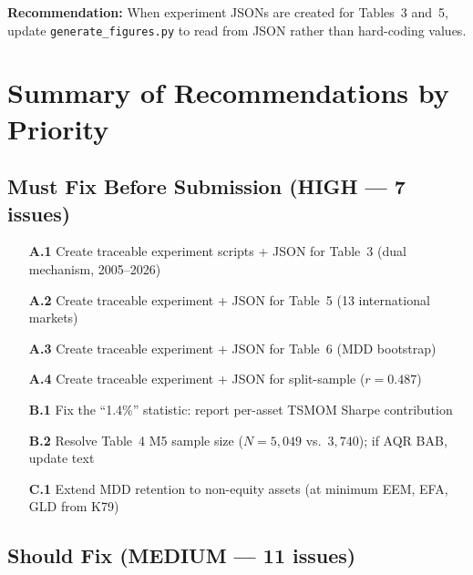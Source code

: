 \documentclass[12pt,a4paper]{article}
\begin{document}
\textbf{Recommendation:} When experiment JSONs are created for Tables~3 and~5, update \texttt{generate\_figures.py} to read from JSON rather than hard-coding values.


\section{Summary of Recommendations by Priority}
\label{sec:recommendations}

\subsection*{Must Fix Before Submission (HIGH --- 7 issues)}

\begin{enumerate}
    \item[\textbf{A.1}] Create traceable experiment scripts + JSON for Table~3 (dual mechanism, 2005--2026)
    \item[\textbf{A.2}] Create traceable experiment + JSON for Table~5 (13 international markets)
    \item[\textbf{A.3}] Create traceable experiment + JSON for Table~6 (MDD bootstrap)
    \item[\textbf{A.4}] Create traceable experiment + JSON for split-sample ($r = 0.487$)
    \item[\textbf{B.1}] Fix the ``1.4\%'' statistic: report per-asset TSMOM Sharpe contribution
    \item[\textbf{B.2}] Resolve Table~4 M5 sample size ($N = 5{,}049$ vs.\ $3{,}740$); if AQR BAB, update text
    \item[\textbf{C.1}] Extend MDD retention to non-equity assets (at minimum EEM, EFA, GLD from K79)
\end{enumerate}

\subsection*{Should Fix (MEDIUM --- 11 issues)}
\end{document}
